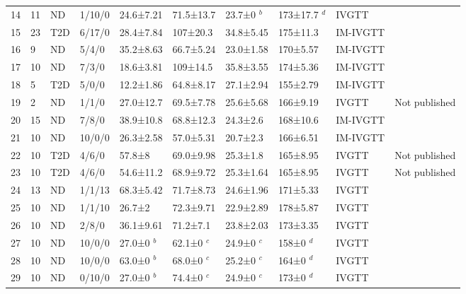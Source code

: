 \documentclass[utf8]{frontiersSCNS} %
\begin{document}
\begin{table}[h]
{\begin{tabular}{llllllllll}
14 & 11 & ND & 1/10/0  & 24.6±7.21   & 71.5±13.7 & 23.7±0 $^b$    & 173±17.7 $^d$ & IVGTT    & \citet{Viviani1999}  \\
15 & 23 & T2D & 6/17/0  & 28.4±7.84   & 107±20.3  & 34.8±5.45   & 175±11.3   & IM-IVGTT & \citet{2005_Young}       \\
16 & 9  & ND & 5/4/0   & 35.2±8.63   & 66.7±5.24 & 23.0±1.58     & 170±5.57   & IM-IVGTT & \citet{2005_Young}       \\
17 & 10 & ND & 7/3/0   & 18.6±3.81   & 109±14.5  & 35.8±3.55   & 174±5.36   & IM-IVGTT & \citet{2005_Young}       \\
18 & 5  & T2D & 5/0/0   & 12.2±1.86   & 64.8±8.17 & 27.1±2.94   & 155±2.79   & IM-IVGTT & \citet{2005_Young}      \\
19 & 2  & ND & 1/1/0   & 27.0±12.7     & 69.5±7.78 & 25.6±5.68   & 166±9.19   & IVGTT   & Not published  \\
20 & 15 & ND & 7/8/0   & 38.9±10.8   & 68.8±12.3 & 24.3±2.6    & 168±10.6   & IM-IVGTT & \citet{IM_IV_1998}      \\
21 & 10 & ND & 10/0/0  & 26.3±2.58   & 57.0±5.31   & 20.7±2.3    & 166±6.51   & IM-IVGTT & \citet{2005_PCOS_Gennarelli}     \\
22 & 10 & T2D & 4/6/0   & 57.8±8      & 69.0±9.98   & 25.3±1.8    & 165±8.95   & IVGTT     & Not published  \\
23 & 10 & T2D & 4/6/0   & 54.6±11.2   & 68.9±9.72 & 25.3±1.64   & 165±8.95   & IVGTT    & Not published  \\
24 & 13 & ND & 1/1/13  & 68.3±5.42   & 71.7±8.73 & 24.6±1.96   & 171±5.33   & IVGTT     & \citet{pacini_1998}                      \\
25 & 10 & ND & 1/1/10  & 26.7±2      & 72.3±9.71 & 22.9±2.89   & 178±5.87   & IVGTT    & \citet{pacini_1998}                      \\
26 & 10 & ND & 2/8/0   & 36.1±9.61   & 71.2±7.1  & 23.8±2.03   & 173±3.35   & IVGTT    & \citet{nardi_1994}                      \\
27 & 10 & ND & 10/0/0  & 27.0±0 $^b$      & 62.1±0 $^c$  & 24.9±0 $^c$    & 158±0 $^d$    & IVGTT    & \citet{1998_AGING_Ahren}         \\
28 & 10 & ND & 10/0/0  & 63.0±0 $^b$      & 68.0±0 $^c$    & 25.2±0 $^c$    & 164±0 $^d$    & IVGTT    & \citet{1998_AGING_Ahren}         \\
29 & 10 & ND & 0/10/0  & 27.0±0 $^b$      & 74.4±0 $^c$  & 24.9±0 $^c$    & 173±0 $^d$    & IVGTT    & \citet{1998_AGING_Ahren}        \\

\end{tabular}}
\end{table}
\end{document}
